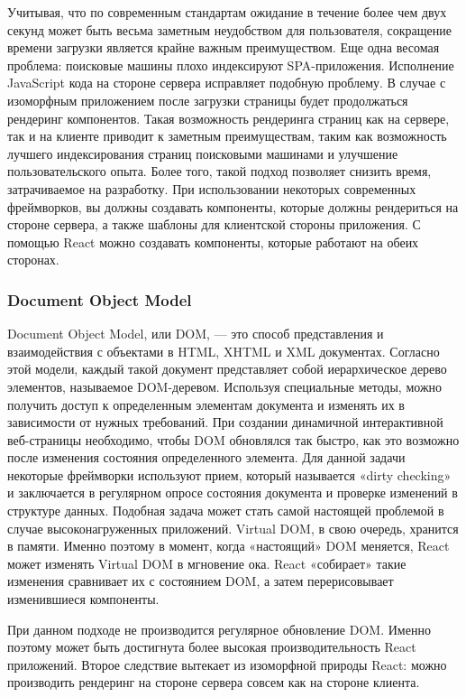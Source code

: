 Учитывая, что по современным стандартам ожидание в течение более чем двух секунд может быть весьма заметным неудобством для пользователя, сокращение времени загрузки 
является крайне важным преимуществом. Еще одна весомая проблема: поисковые машины плохо индексируют SPA-приложения. Исполнение JavaScript кода на стороне сервера исправляет 
подобную проблему. В случае с изоморфным приложением после загрузки страницы будет продолжаться рендеринг компонентов. Такая возможность рендеринга страниц как на сервере, так и 
на клиенте приводит к заметным преимуществам, таким как возможность лучшего индексирования страниц поисковыми машинами и улучшение пользовательского опыта. Более того, такой подход 
позволяет снизить время, затрачиваемое на разработку. При использовании некоторых современных фреймворков, вы должны создавать компоненты, которые должны рендериться на стороне сервера, 
а также шаблоны для клиентской стороны приложения. С помощью React можно создавать компоненты, которые работают на обеих сторонах.

\subsubsection{Document Object Model}

Document Object Model, или DOM, — это способ представления и взаимодействия с объектами в HTML, XHTML и XML документах. Согласно этой модели, каждый такой документ
представляет собой иерархическое дерево элементов, называемое DOM-деревом. Используя специальные методы, можно получить доступ к определенным элементам документа и 
изменять их в зависимости от нужных требований. При создании динамичной интерактивной веб-страницы необходимо, чтобы DOM обновлялся так быстро, как это возможно после 
изменения состояния определенного элемента. Для данной задачи некоторые фреймворки используют прием, который называется «dirty checking» и заключается в регулярном опросе 
состояния документа и проверке изменений в структуре данных. Подобная задача может стать самой настоящей проблемой в случае высоконагруженных приложений. Virtual DOM, в свою 
очередь, хранится в памяти. Именно поэтому в момент, когда «настоящий» DOM меняется, React может изменять Virtual DOM в мгновение ока. React «собирает» такие изменения сравнивает 
их с состоянием DOM, а затем перерисовывает изменившиеся компоненты.

При данном подходе не производится регулярное обновление DOM. Именно поэтому может быть достигнута более высокая производительность React приложений. Второе следствие вытекает 
из изоморфной природы React: можно производить рендеринг на стороне сервера совсем как на стороне клиента.

